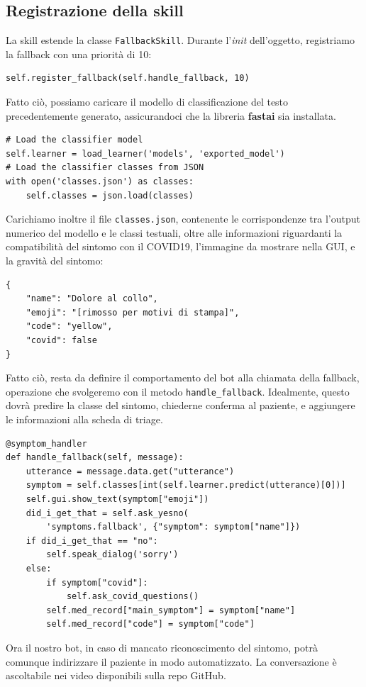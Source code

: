\subsection{Registrazione della skill}
La skill estende la classe \texttt{FallbackSkill}. Durante l'\textit{init} dell'oggetto, registriamo la fallback con una priorità di 10:
\begin{verbatim}
self.register_fallback(self.handle_fallback, 10)
\end{verbatim}
Fatto ciò, possiamo caricare il modello di classificazione del testo precedentemente generato, assicurandoci che la libreria \textbf{fastai} sia installata.
\begin{verbatim}
# Load the classifier model
self.learner = load_learner('models', 'exported_model')
# Load the classifier classes from JSON
with open('classes.json') as classes:
    self.classes = json.load(classes)
\end{verbatim}
Carichiamo inoltre il file \texttt{classes.json}, contenente le corrispondenze tra l'output numerico del modello e le classi testuali, oltre alle informazioni riguardanti la compatibilità del sintomo con il COVID19, l'immagine da mostrare nella GUI, e la gravità del sintomo:
\begin{verbatim}
{
    "name": "Dolore al collo",
    "emoji": "[rimosso per motivi di stampa]",
    "code": "yellow",
    "covid": false
}
\end{verbatim}
Fatto ciò, resta da definire il comportamento del bot alla chiamata della fallback, operazione che svolgeremo con il metodo \texttt{handle\_fallback}.
Idealmente, questo dovrà predire la classe del sintomo, chiederne conferma al paziente, e aggiungere le informazioni alla scheda di triage.
\begin{verbatim}
@symptom_handler
def handle_fallback(self, message):
    utterance = message.data.get("utterance")
    symptom = self.classes[int(self.learner.predict(utterance)[0])]
    self.gui.show_text(symptom["emoji"])
    did_i_get_that = self.ask_yesno(
        'symptoms.fallback', {"symptom": symptom["name"]})
    if did_i_get_that == "no":
        self.speak_dialog('sorry')
    else:
        if symptom["covid"]:
            self.ask_covid_questions()
        self.med_record["main_symptom"] = symptom["name"]
        self.med_record["code"] = symptom["code"]
\end{verbatim}
Ora il nostro bot, in caso di mancato riconoscimento del sintomo, potrà comunque indirizzare il paziente in modo automatizzato. La conversazione è ascoltabile nei video disponibili sulla repo GitHub\cite{media:videos}.
